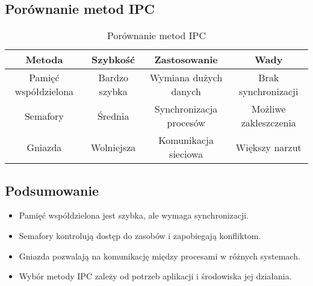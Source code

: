 \subsection{Porównanie metod IPC}

\begin{table}[h]
    \centering
    \renewcommand{\arraystretch}{1.3}
    \begin{tabular}{|c|c|c|c|}
        \hline
        \textbf{Metoda} & \textbf{Szybkość} & \textbf{Zastosowanie} & \textbf{Wady} \\
        \hline
        Pamięć współdzielona & Bardzo szybka & Wymiana dużych danych & Brak synchronizacji \\
        \hline
        Semafory & Średnia & Synchronizacja procesów & Możliwe zakleszczenia \\
        \hline
        Gniazda & Wolniejsza & Komunikacja sieciowa & Większy narzut \\
        \hline
    \end{tabular}
    \caption{Porównanie metod IPC}
\end{table}

\subsection{Podsumowanie}
\begin{itemize}
    \item Pamięć współdzielona jest szybka, ale wymaga synchronizacji.
    \item Semafory kontrolują dostęp do zasobów i zapobiegają konfliktom.
    \item Gniazda pozwalają na komunikację między procesami w różnych systemach.
    \item Wybór metody IPC zależy od potrzeb aplikacji i środowiska jej działania.
\end{itemize}
